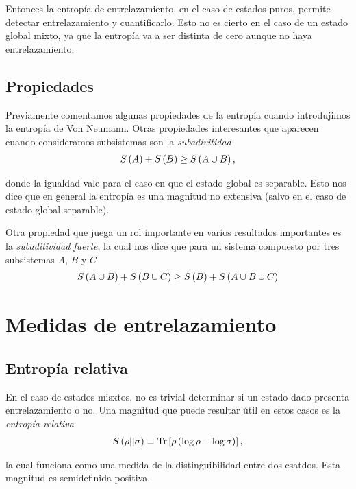 \documentclass[../main.tex]{subfiles}
\begin{document}
Entonces la entropía de entrelazamiento, en el caso de estados puros, permite detectar entrelazamiento y cuantificarlo. Esto no es cierto en el caso de un estado global mixto, ya que la entropía va a ser distinta de cero aunque no haya entrelazamiento.

\subsection{Propiedades}

Previamente comentamos algunas propiedades de la entropía cuando introdujimos la entropía de Von Neumann. Otras propiedades interesantes que aparecen cuando consideramos subsistemas son la \textit{subadivitidad}
\begin{align}
	S\left ( A \right ) + S\left ( B \right ) \geq S\left ( A \cup B \right ),
\end{align}

\noindent donde la igualdad vale para el caso en que el estado global es separable. Esto nos dice que en general la entropía es una magnitud no extensiva (salvo en el caso de estado global separable).

Otra propiedad que juega un rol importante en varios resultados importantes es la \textit{subaditividad fuerte}, la cual nos dice que para un sistema compuesto por tres subsistemas $A$, $B$ y $C$
\begin{align}
	S\left ( A \cup B \right ) + S\left ( B \cup C \right ) \geq S\left ( B \right ) + S\left ( A \cup B \cup C \right )
\end{align}

\section{Medidas de entrelazamiento}

\subsection{Entropía relativa}

En el caso de estados misxtos, no es trivial determinar si un estado dado presenta entrelazamiento o no. Una magnitud que puede resultar útil en estos casos es la \textit{entropía relativa}
\begin{align}
	S\left ( \rho || \sigma \right ) \equiv \text{Tr}\left [ \rho \left ( \log \rho - \log \sigma \right ) \right ],
\end{align}

\noindent la cual funciona como una medida de la distinguibilidad entre dos esatdos. Esta magnitud es semidefinida positiva.
\end{document}
